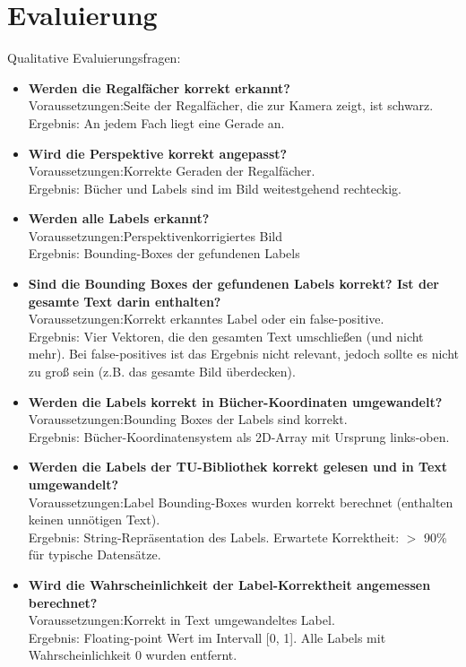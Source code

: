 \documentclass[deutsch]{scrartcl}
\newcommand\tab[1][1cm]{\hspace*{#1}}
\begin{document}
\section{Evaluierung}

Qualitative Evaluierungsfragen:
\begin{itemize}
	\item \textbf{Werden die Regalfächer korrekt erkannt?}\\
		  Voraussetzungen:\tab Seite der Regalfächer, die zur Kamera zeigt, ist schwarz.\\
		  Ergebnis:\tab[2.2cm] An jedem Fach liegt eine Gerade an.
	\item \textbf{Wird die Perspektive korrekt angepasst?}\\
		  Voraussetzungen:\tab Korrekte Geraden der Regalfächer.\\
		  Ergebnis:\tab[2.2cm] Bücher und Labels sind im Bild weitestgehend rechteckig.
	\item \textbf{Werden alle Labels erkannt?}\\
		  Voraussetzungen:\tab Perspektivenkorrigiertes Bild\\
		  Ergebnis:\tab[2.2cm] Bounding-Boxes der gefundenen Labels
	\item \textbf{Sind die Bounding Boxes der gefundenen Labels korrekt? Ist der gesamte Text darin enthalten?}\\
		  Voraussetzungen:\tab Korrekt erkanntes Label oder ein false-positive.\\
		  Ergebnis:\tab[2.2cm] Vier Vektoren, die den gesamten Text umschließen (und nicht mehr). Bei false-positives ist das Ergebnis nicht relevant, jedoch sollte es nicht zu groß sein (z.B. das gesamte Bild überdecken).
	\item \textbf{Werden die Labels korrekt in Bücher-Koordinaten umgewandelt?}\\
		  Voraussetzungen:\tab Bounding Boxes der Labels sind korrekt.\\
		  Ergebnis:\tab[2.2cm] Bücher-Koordinatensystem als 2D-Array mit Ursprung links-oben.
	\item \textbf{Werden die Labels der TU-Bibliothek korrekt gelesen und in Text umgewandelt?}\\
		  Voraussetzungen:\tab Label Bounding-Boxes wurden korrekt berechnet (enthalten keinen unnötigen Text).\\
		  Ergebnis:\tab[2.2cm] String-Repräsentation des Labels. Erwartete Korrektheit: $>$ 90\% für typische Datensätze.
	\item \textbf{Wird die Wahrscheinlichkeit der Label-Korrektheit angemessen berechnet?}\\
		  Voraussetzungen:\tab Korrekt in Text umgewandeltes Label.\\
		  Ergebnis:\tab[2.2cm] Floating-point Wert im Intervall [0, 1]. Alle Labels mit Wahrscheinlichkeit 0 wurden entfernt.
\end{itemize}
\end{document}
